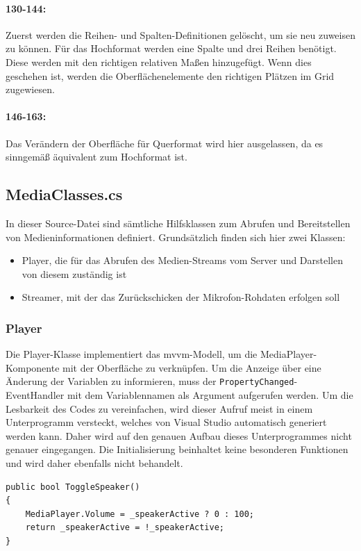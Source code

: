 \paragraph{130-144:} Zuerst werden die Reihen- und Spalten-Definitionen gelöscht, um sie neu zuweisen zu können.
Für das Hochformat werden eine Spalte und drei Reihen benötigt.
Diese werden mit den richtigen relativen Maßen hinzugefügt.
Wenn dies geschehen ist, werden die Oberflächenelemente den richtigen Plätzen im Grid zugewiesen.
\paragraph{146-163:} Das Verändern der Oberfläche für Querformat wird hier ausgelassen, da es sinngemäß äquivalent zum Hochformat ist.
\subsection{MediaClasses.cs}
\label{ssec:classes}
In dieser Source-Datei sind sämtliche Hilfsklassen zum Abrufen und Bereitstellen von Medieninformationen definiert.
Grundsätzlich finden sich hier zwei Klassen:
\begin{itemize}
    \item Player, die für das Abrufen des Medien-Streams vom Server und Darstellen von diesem zuständig ist
    \item Streamer, mit der das Zurückschicken der Mikrofon-Rohdaten erfolgen soll
\end{itemize}
\subsubsection{Player}
Die Player-Klasse implementiert das \ac{mvvm}-Modell, um die MediaPlayer-Komponente mit der Oberfläche zu verknüpfen.
Um die Anzeige über eine Änderung der Variablen zu informieren, muss der \texttt{PropertyChanged}-EventHandler mit dem Variablennamen als Argument aufgerufen werden.
Um die Lesbarkeit des Codes zu vereinfachen, wird dieser Aufruf meist in einem Unterprogramm versteckt, welches von Visual Studio automatisch generiert werden kann.
Daher wird auf den genauen Aufbau dieses Unterprogrammes nicht genauer eingegangen.
Die Initialisierung beinhaltet keine besonderen Funktionen und wird daher ebenfalls nicht behandelt.

\begin{verbatim}
public bool ToggleSpeaker()
{
    MediaPlayer.Volume = _speakerActive ? 0 : 100;
    return _speakerActive = !_speakerActive;
}
\end{verbatim}
